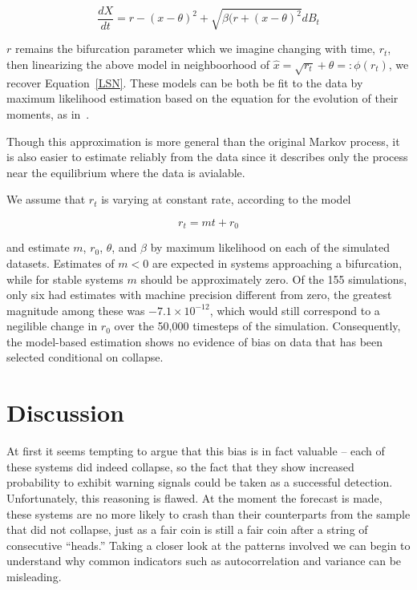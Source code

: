 \documentclass[authoryear,review,12pt]{elsarticle}
\begin{document}
\begin{equation}
  \frac{dX}{dt} = r - (x-\theta)^2 + \sqrt{ \beta (r + (x-\theta)^2 } dB_t
\end{equation}

$r$ remains the bifurcation parameter which we imagine changing with time,
$r_t$, then linearizing the above model in neighboorhood of
\(\hat x = \sqrt{r_t} +\theta =: \phi(r_t)\), we recover Equation~\eqref{LSN}.
These models can be both be fit to the data by maximum likelihood estimation
based on the equation for the evolution of their moments, as
in~\citet{Boettiger2012b}.  

Though this approximation is more general than the original Markov process,
it is also easier to estimate reliably from the data since it describes only 
the process near the equilibrium where the data is avialable.  

We assume that $r_t$ is varying at constant rate, according to the model

\begin{equation}
 r_t = m t + r_0 
\end{equation}

and estimate $m$, $r_0$, $\theta$, and $\beta$ by maximum likelihood on each
of the simulated datasets.  Estimates of $m < 0 $ are expected in systems 
approaching a bifurcation, while for stable systems $m$ should be approximately zero.
Of the 155 simulations, only six had estimates with machine precision different
from zero, the greatest magnitude among these was $-7.1 \times 10^{-12}$,
which would still correspond to a negilible change in $r_0$ over the 50,000 timesteps
of the simulation.  Consequently, the model-based estimation shows no 
evidence of bias on data that has been selected conditional on collapse.   

 \section{Discussion}
At first it seems tempting to argue that this bias is in fact valuable -- each
of these systems did indeed collapse, so the fact that they show increased 
probability to exhibit warning signals could be taken as a successful detection.
Unfortunately, this reasoning is flawed. At the moment the forecast is made,
these systems are no more likely to crash than their counterparts from the sample
that did not collapse, just as a fair coin is still a fair coin after a string of
consecutive ``heads.''  Taking a closer look at the patterns involved we can
begin to understand why common indicators such as autocorrelation and variance
can be misleading.
\end{document}
